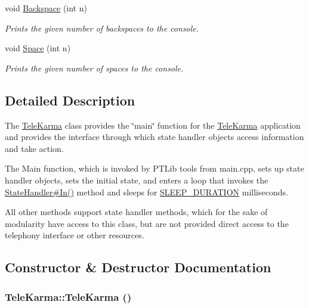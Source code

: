 \begin{CompactItemize}
void \hyperlink{classTeleKarma_8f93d5531f5914eb77d7f0fe341e20cf}{Backspace} (int n)
\begin{CompactList}\small\item\em Prints the given number of backspaces to the console. \item\end{CompactList}\item 
void \hyperlink{classTeleKarma_523695bc8f4ab8c3f6cb950c53efc026}{Space} (int n)
\begin{CompactList}\small\item\em Prints the given number of spaces to the console. \item\end{CompactList}\end{CompactItemize}


\subsection{Detailed Description}
The \hyperlink{classTeleKarma}{TeleKarma} class provides the \char`\"{}main\char`\"{} function for the \hyperlink{classTeleKarma}{TeleKarma} application and provides the interface through which state handler objects access information and take action. 

The Main function, which is invoked by PTLib tools from main.cpp, sets up state handler objects, sets the initial state, and enters a loop that invokes the \hyperlink{classStateHandler_cee16f855e7354d21abafa47acd1046c}{StateHandler\#In()} method and sleeps for \hyperlink{}{SLEEP\_\-DURATION} milliseconds. 

All other methods support state handler methods, which for the sake of modularity have access to this class, but are not provided direct access to the telephony interface or other resources.  

\subsection{Constructor \& Destructor Documentation}
\hypertarget{classTeleKarma_e51315e12cf9e918a0eacce8333e298e}{
\subsubsection[{TeleKarma}]{\setlength{\rightskip}{0pt plus 5cm}TeleKarma::TeleKarma ()}}
\label{classTeleKarma_e51315e12cf9e918a0eacce8333e298e}


